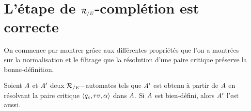 \section{L'étape de ${\mathcal R_{/E}}$-complétion est correcte}

On commence par montrer grâce aux différentes propriétés que l'on a montrées sur la 
normalisation et le filtrage que la résolution d'une paire critique préserve la
bonne-définition.

\begin{lemma}
  \label{lemma:C-well-defined}
  Soient $\mathit A$ et $\mathit A'$ deux ${\mathcal R_{/E}}-$automates tels que 
  $\mathit A'$ est obtenu à partir de $\mathit A$ en résolvant 
  la paire critique $\langle q_c, r\sigma,\alpha \rangle$ dans $\mathit A$. 
  Si $\mathit A$ est bien-défini, alors $\mathit A'$ l'est aussi. 
\end{lemma}
